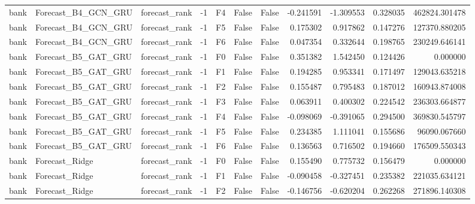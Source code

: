 \begin{tabular}{lllrlllrrrr}
      bank &          Forecast\_B4\_GCN\_GRU & forecast\_rank &    -1 &  F4 &           False &            False & -0.241591 & -1.309553 & 0.328035 &    462824.301478 \\
      bank &          Forecast\_B4\_GCN\_GRU & forecast\_rank &    -1 &  F5 &           False &            False &  0.175302 &  0.917862 & 0.147276 &    127370.880205 \\
      bank &          Forecast\_B4\_GCN\_GRU & forecast\_rank &    -1 &  F6 &           False &            False &  0.047354 &  0.332644 & 0.198765 &    230249.646141 \\
      bank &          Forecast\_B5\_GAT\_GRU & forecast\_rank &    -1 &  F0 &           False &            False &  0.351382 &  1.542450 & 0.124426 &         0.000000 \\
      bank &          Forecast\_B5\_GAT\_GRU & forecast\_rank &    -1 &  F1 &           False &            False &  0.194285 &  0.953341 & 0.171497 &    129043.635218 \\
      bank &          Forecast\_B5\_GAT\_GRU & forecast\_rank &    -1 &  F2 &           False &            False &  0.155487 &  0.795483 & 0.187012 &    160943.874008 \\
      bank &          Forecast\_B5\_GAT\_GRU & forecast\_rank &    -1 &  F3 &           False &            False &  0.063911 &  0.400302 & 0.224542 &    236303.664877 \\
      bank &          Forecast\_B5\_GAT\_GRU & forecast\_rank &    -1 &  F4 &           False &            False & -0.098069 & -0.391065 & 0.294500 &    369830.545797 \\
      bank &          Forecast\_B5\_GAT\_GRU & forecast\_rank &    -1 &  F5 &           False &            False &  0.234385 &  1.111041 & 0.155686 &     96090.067660 \\
      bank &          Forecast\_B5\_GAT\_GRU & forecast\_rank &    -1 &  F6 &           False &            False &  0.136563 &  0.716502 & 0.194660 &    176509.550343 \\
      bank &               Forecast\_Ridge & forecast\_rank &    -1 &  F0 &           False &            False &  0.155490 &  0.775732 & 0.156479 &         0.000000 \\
      bank &               Forecast\_Ridge & forecast\_rank &    -1 &  F1 &           False &            False & -0.090458 & -0.327451 & 0.235382 &    221035.634121 \\
      bank &               Forecast\_Ridge & forecast\_rank &    -1 &  F2 &           False &            False & -0.146756 & -0.620204 & 0.262268 &    271896.140308 \\

\end{tabular}
